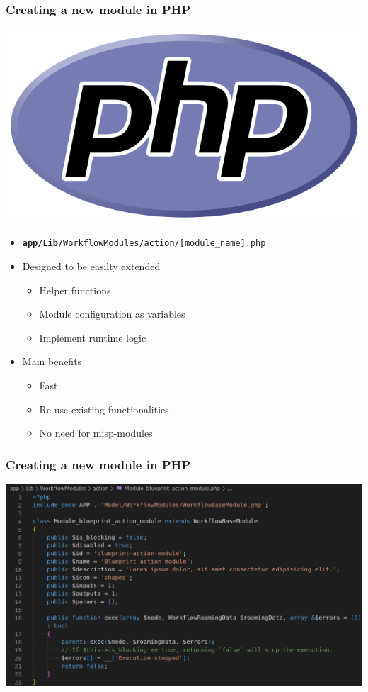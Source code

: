 \begin{frame}
    \frametitle{Creating a new module in PHP}
    \begin{center}
        \includegraphics[scale=0.1]{pictures/PHP-logo.png}
    \end{center}
    \vspace*{2em}
    \begin{itemize}
        \item \texttt{\small \textbf{app/Lib/}WorkflowModules/action/[module\_name].php}
        \item Designed to be easilty extended
        \begin{itemize}
            \item Helper functions
            \item Module configuration as variables
            \item Implement runtime logic
        \end{itemize}
        \item Main benefits
        \begin{itemize}
            \item Fast
            \item Re-use existing functionalities
            \item No need for misp-modules
        \end{itemize}
    \end{itemize}
\end{frame}

\begin{frame}
    \frametitle{Creating a new module in PHP}
    \begin{center}
        \includegraphics[width=1.0\linewidth]{pictures/custom-1.png}
    \end{center}
\end{frame}

